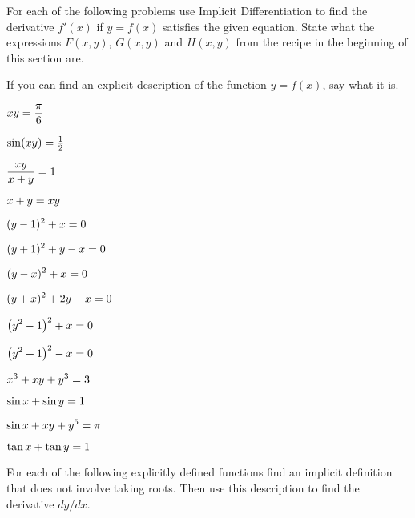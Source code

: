 \begin{multicols}{2}
\setlength{\parindent}{0pt}
For each of the following problems use Implicit Differentiation to
find the derivative $f'(x)$ if $y=f(x)$ satisfies the given equation.
State what the expressions $F(x, y)$, $G(x, y)$ and $H(x, y)$ from the
recipe in the beginning of this section are.




If you can find an explicit description of the function $y=f(x)$, say
what it is.












\problem $\displaystyle xy=\frac\pi6$ 




\problem $\displaystyle \sin(xy)=\tfrac12 $ 




\problem $\displaystyle \frac{xy}{x+y}=1 $ 




\problem $\displaystyle x+y=xy $ 




\problem $\displaystyle (y-1)^2 + x = 0$ 




\problem $\displaystyle (y+1)^2 + y - x = 0$ 




\problem $\displaystyle (y-x)^2 + x = 0$ 




\problem $\displaystyle (y+x)^2 + 2y - x = 0$ 




\problem $\displaystyle \bigl(y^2-1 \bigr)^2 + x = 0$ 




\problem $\displaystyle \bigl(y^2+1 \bigr)^2 - x = 0$ 




\problem $\displaystyle x^3+xy+y^3=3 $ 




\problem $\displaystyle \sin x +\sin y = 1 $ 




\problem $\displaystyle \sin x + xy+y^5=\pi $ 




\problem $\displaystyle \tan x +\tan y = 1 $ 




For each of the following explicitly defined functions find an implicit
definition that does not involve taking roots.  Then use this description to
find the derivative $dy/dx$.





\end{multicols}
